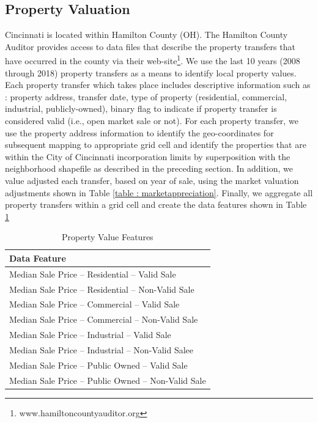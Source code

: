 \documentclass{llncs}
\begin{document}

\subsection{Property Valuation}

Cincinnati is located within Hamilton County (OH). The Hamilton County Auditor provides access to data files that describe the property transfers that have occurred in the county via their web-site\footnote{\label{hcauditor}www.hamiltoncountyauditor.org}. We use the last 10 years (2008 through 2018) property transfers as a means to identify local property values. Each property transfer which takes place includes descriptive information such as : property address, transfer date, type of property (residential, commercial, industrial, publicly-owned), binary flag to indicate if property transfer is considered valid (i.e., open market sale or not). For each property transfer, we use the property address information to identify the geo-coordinates for subsequent mapping to appropriate grid cell and identify the properties that are within the City of Cincinnati incorporation limits by superposition with the neighborhood shapefile as described in the preceding section. In addition, we value adjusted each transfer, based on year of sale, using the market valuation adjustments shown in Table  \ref{table : marketappreciation}. Finally, we aggregate all property transfers within a grid cell and create the data features shown in Table \ref{table : propertyValueFeatures} 


\FloatBarrier
\begin{table}[!h]
\begin{center}
\caption{Property Value Features}
\label{table : propertyValueFeatures}
\begin{tabular}{ p{}}
\hline
\rule{0pt}{12pt}
Data Feature	\\
\hline
Median Sale Price – Residential – Valid Sale\\
Median Sale Price – Residential – Non-Valid Sale\\
Median Sale Price – Commercial – Valid Sale\\
Median Sale Price – Commercial – Non-Valid Sale\\
Median Sale Price – Industrial – Valid Sale\\
Median Sale Price – Industrial – Non-Valid Salee\\
Median Sale Price – Public Owned – Valid Sale\\
Median Sale Price – Public Owned – Non-Valid Sale\\[2pt]
\hline
\end{tabular}
\end{center}
\end{table}
\FloatBarrier
%
\end{document}
